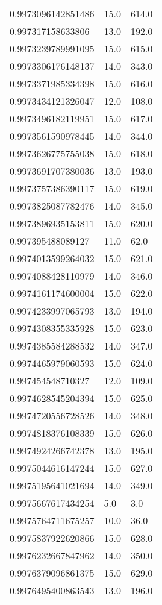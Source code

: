 \begin{center}
\begin{supertabular}[H]{p{0.30\textwidth}p{0.05\textwidth}p{0.05\textwidth}}
0.9973096142851486 & 15.0 & 614.0 \\ 
0.997317158633806 & 13.0 & 192.0 \\ 
0.9973239789991095 & 15.0 & 615.0 \\ 
0.9973306176148137 & 14.0 & 343.0 \\ 
0.9973371985334398 & 15.0 & 616.0 \\ 
0.9973434121326047 & 12.0 & 108.0 \\ 
0.9973496182119951 & 15.0 & 617.0 \\ 
0.9973561590978445 & 14.0 & 344.0 \\ 
0.9973626775755038 & 15.0 & 618.0 \\ 
0.9973691707380036 & 13.0 & 193.0 \\ 
0.9973757386390117 & 15.0 & 619.0 \\ 
0.9973825087782476 & 14.0 & 345.0 \\ 
0.9973896935153811 & 15.0 & 620.0 \\ 
0.997395488089127 & 11.0 & 62.0 \\ 
0.9974013599264032 & 15.0 & 621.0 \\ 
0.9974088428110979 & 14.0 & 346.0 \\ 
0.9974161174600004 & 15.0 & 622.0 \\ 
0.9974233997065793 & 13.0 & 194.0 \\ 
0.9974308355335928 & 15.0 & 623.0 \\ 
0.9974385584288532 & 14.0 & 347.0 \\ 
0.9974465979060593 & 15.0 & 624.0 \\ 
0.997454548710327 & 12.0 & 109.0 \\ 
0.9974628545204394 & 15.0 & 625.0 \\ 
0.9974720556728526 & 14.0 & 348.0 \\ 
0.9974818376108339 & 15.0 & 626.0 \\ 
0.9974924266742378 & 13.0 & 195.0 \\ 
0.9975044616147244 & 15.0 & 627.0 \\ 
0.9975195641021694 & 14.0 & 349.0 \\ 
0.9975667617434254 & 5.0 & 3.0 \\ 
0.9975764711675257 & 10.0 & 36.0 \\ 
0.9975837922620866 & 15.0 & 628.0 \\ 
0.9976232667847962 & 14.0 & 350.0 \\ 
0.9976379096861375 & 15.0 & 629.0 \\ 
0.9976495400863543 & 13.0 & 196.0 \\ 

\end{supertabular}
\end{center}

